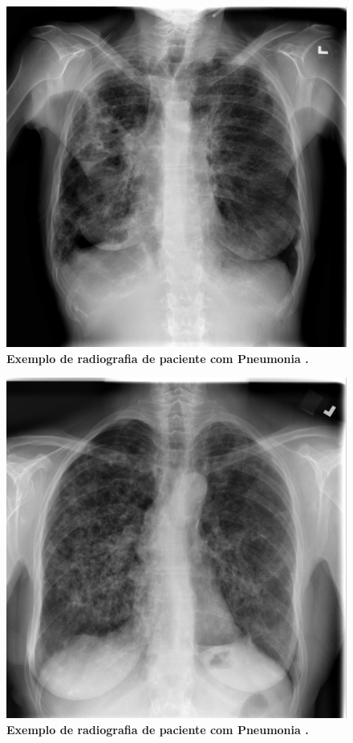 \documentclass[
12pt,        %
oneside,     %
a4paper,     %
english,       %
brazil        %
%
%
]{ppgca}
\begin{document}
\begin{figure}[H]
    \includegraphics[scale=0.28]{pneumo1.png}
    \centering
    \caption{\textbf{Exemplo de radiografia de paciente com Pneumonia \cite{repo4}.}}
    \label{fig:pneumo1}
\end{figure}

\begin{figure}[H]
    \includegraphics[scale=0.28]{pneumo2.png}
    \centering
    \caption{\textbf{Exemplo de radiografia de paciente com Pneumonia \cite{repo4}.}}
    \label{fig:pneumo2}
\end{figure}
\end{document}
